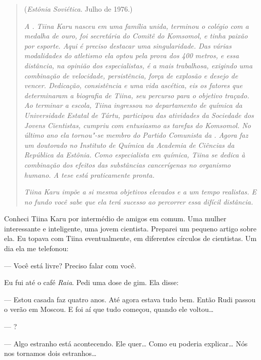 \begin{quotation}
\begin{flushright}
(\emph{Estônia Soviética}. Julho de 1976.)
\end{flushright}
\vspace{4pt}
\noindent\emph{A . Tiina Karu nasceu em uma família unida,
terminou o colégio com a medalha de ouro, foi secretária do Comitê do
Komsomol, e tinha paixão por esporte. Aqui é preciso destacar uma
singularidade. Das várias modalidades do atletismo ela optou pela prova
dos 400 metros, e essa distância, na opinião dos especialistas, é a mais
trabalhosa, exigindo uma combinação de velocidade, persistência, força
de explosão e desejo de vencer. Dedicação, consistência e uma vida
ascética, eis os fatores que determinaram a biografia de Tiina, seu
percurso para o objetivo traçado. Ao terminar a escola, Tiina ingressou
no departamento de química da Universidade Estatal de Tártu, participou
das atividades da Sociedade dos Jovens Cientistas, cumpriu com
entusiasmo as tarefas do Komsomol. No último ano ela tornou"-se membro do
Partido Comunista da . Agora faz um doutorado no Instituto de
Química da Academia de Ciências da República da Estônia. Como
especialista em química, Tiina se dedica à combinação dos efeitos das
substâncias cancerígenas no organismo humano. A tese está praticamente
pronta.}

\emph{Tiina Karu impõe a si mesma objetivos elevados e a um tempo
realistas. E no fundo você sabe que ela terá sucesso ao percorrer essa
difícil distância.}
\end{quotation}

Conheci Tiina Karu por intermédio de amigos em comum. Uma mulher
interessante e inteligente, uma jovem cientista. Preparei um pequeno
artigo sobre ela. Eu topava com Tiina eventualmente, em diferentes
círculos de cientistas. Um dia ela me telefonou:

--- Você está livre? Preciso falar com você.

Eu fui até o café \emph{Raia}. Pedi uma dose de gim. Ela disse:

--- Estou casada faz quatro anos. Até agora estava tudo bem. Então Rudi
passou o verão em Moscou. E foi aí que tudo começou, quando ele
voltou\ldots{}

--- ?

--- Algo estranho está acontecendo. Ele quer\ldots{} Como eu poderia
explicar\ldots{} Nós nos tornamos dois estranhos\ldots{}

